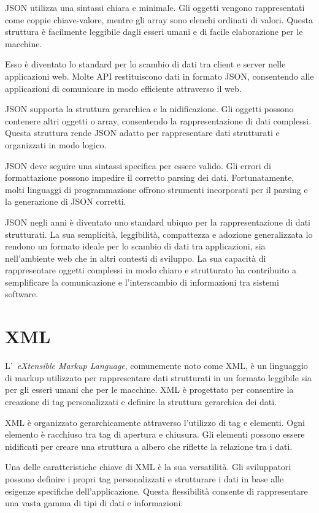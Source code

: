 JSON utilizza una sintassi chiara e minimale. Gli oggetti vengono rappresentati come coppie chiave-valore, mentre gli array sono elenchi ordinati di valori. Questa struttura è facilmente leggibile dagli esseri umani e di facile elaborazione per le macchine.

Esso è diventato lo standard per lo scambio di dati tra client e server nelle applicazioni web. Molte API restituiscono dati in formato JSON, consentendo alle applicazioni di comunicare in modo efficiente attraverso il web.

JSON supporta la struttura gerarchica e la nidificazione. Gli oggetti possono contenere altri oggetti o array, consentendo la rappresentazione di dati complessi. Questa struttura rende JSON adatto per rappresentare dati strutturati e organizzati in modo logico.

JSON deve seguire una sintassi specifica per essere valido. Gli errori di formattazione possono impedire il corretto parsing dei dati. Fortunatamente, molti linguaggi di programmazione offrono strumenti incorporati per il parsing e la generazione di JSON corretti.

JSON negli  anni è diventato uno standard ubiquo per la rappresentazione di dati strutturati. La sua semplicità, leggibilità, compattezza e adozione generalizzata lo rendono un formato ideale per lo scambio di dati tra applicazioni, sia nell'ambiente web che in altri contesti di sviluppo. La sua capacità di rappresentare oggetti complessi in modo chiaro e strutturato ha contribuito a semplificare la comunicazione e l'interscambio di informazioni tra sistemi software.

\section{XML}
L'~\emph{eXtensible Markup Language}, comunemente noto come XML, è un linguaggio di markup utilizzato per rappresentare dati strutturati in un formato leggibile sia per gli esseri umani che per le macchine. XML è progettato per consentire la creazione di tag personalizzati e definire la struttura gerarchica dei dati.

XML è organizzato gerarchicamente attraverso l'utilizzo di tag e elementi. Ogni elemento è racchiuso tra tag di apertura e chiusura. Gli elementi possono essere nidificati per creare una struttura a albero che riflette la relazione tra i dati.

Una delle caratteristiche chiave di XML è la sua versatilità. Gli sviluppatori possono definire i propri tag personalizzati e strutturare i dati in base alle esigenze specifiche dell'applicazione. Questa flessibilità consente di rappresentare una vasta gamma di tipi di dati e informazioni.

